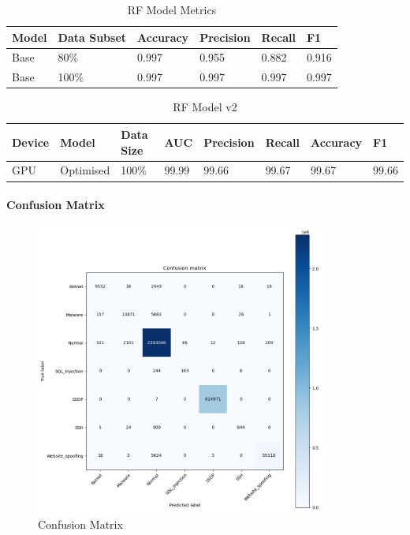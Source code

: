 \begin{table}[h]
\centering
\caption{RF Model Metrics}
\label{tab:rf-metrics}
\begin{tabular}{|l|l|l|l|l|l|}
\hline
\textbf{Model} & \textbf{Data Subset} & \textbf{Accuracy} & \textbf{Precision} & \textbf{Recall} & \textbf{F1}  \\ \hline
Base & 80\% & 0.997 & 0.955 & 0.882 & 0.916  \\ \hline
Base & 100\% & 0.997 & 0.997 & 0.997 & 0.997 \\ \hline
\end{tabular}
\end{table}

\begin{table}[h]
\centering
\caption{RF Model v2}
\label{tab:rf-model2}
\begin{tabular}{|l|l|l|l|l|l|l|l|}
\hline
\textbf{Device} & \textbf{Model} & \textbf{Data Size} & \textbf{AUC} & \textbf{Precision} & \textbf{Recall} & \textbf{Accuracy} & \textbf{F1}  \\ \hline
GPU & Optimised & 100\% & 99.99 & 99.66 & 99.67 & 99.67 & 99.66 \\ \hline
\end{tabular}
\end{table}

\paragraph{Confusion Matrix}

\begin{figure}[H]
    \centering
    \includegraphics[width=0.85\textwidth]{Appendices/NN Confusion Matrix 3-04-23.png}
    \caption{Confusion Matrix}
    \label{fig:rf_confusion_matrix}
\end{figure}


